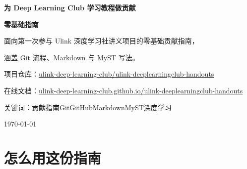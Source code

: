 \documentclass[UTF8,fontset=none,a4paper,11pt]{ctexart}
\begin{document}
\begin{titlepage}
\centering
\vspace*{2.2cm}

{\sffamily\bfseries\Huge 为 Deep Learning Club 学习教程做贡献\par}
\vspace{0.35em}
{\sffamily\bfseries\Huge 零基础指南\par}

\vspace{1.4cm}
{\large 面向第一次参与 Ulink 深度学习社讲义项目的零基础贡献指南，\par}
{\large 涵盖 Git 流程、Markdown 与 MyST 写法。\par}

\vspace{1.6cm}
{\large 项目仓库：\href{https://github.com/ulink-deep-learning-club/ulink-deeplearningclub-handouts}{ulink-deep-learning-club/\allowbreak ulink-deeplearningclub-handouts}\par}
\vspace{0.5em}
{\large 在线文档：\href{https://ulink-deep-learning-club.github.io/ulink-deeplearningclub-handouts/}{ulink-deep-learning-club.github.io/\allowbreak ulink-deeplearningclub-handouts}\par}

\vfill
{\large 关键词：贡献指南\quad Git\quad GitHub\quad Markdown\quad MyST\quad 深度学习\par}
\vspace{0.7cm}
{\large \today\par}
\end{titlepage}

\tableofcontents
\thispagestyle{plain}
\clearpage

\section*{怎么用这份指南}
\end{document}
